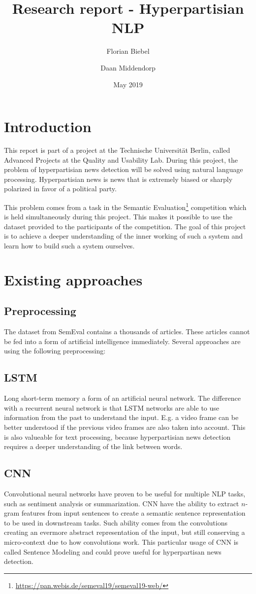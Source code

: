 \documentclass{article}
\title{Research report - Hyperpartisian NLP}
\author{Florian Biebel \and Daan Middendorp}
\date{May 2019}
\begin{document}
\maketitle

\section{Introduction}
This report is part of a project at the Technische Universität Berlin, called Advanced Projects at the Quality and Usability Lab. During this project, the problem of hyperpartisian news detection will be solved using natural language processing. Hyperpartisian news is news that is extremely biased or sharply polarized in favor of a political party.

This problem comes from a task in the Semantic Evaluation\footnote{\url{https://pan.webis.de/semeval19/semeval19-web/}} competition which is held simultaneously during this project. This makes it possible to use the dataset provided to the participants of the competition. The goal of this project is to achieve a deeper understanding of the inner working of such a system and learn how to build such a system ourselves.

\section{Existing approaches}
\subsection{Preprocessing}
The dataset from SemEval contains a thousands of articles. These articles cannot be fed into a form of artificial intelligence immediately. Several approaches are using the following preprocessing:


\subsection{LSTM}
Long short-term memory a form of an artificial neural network. The difference with a recurrent neural network is that LSTM networks are able to use information from the past to understand the input. E.g. a video frame can be better understood if the previous video frames are also taken into account. This is also valueable for text processing, because hyperpartisian news detection requires a deeper understanding of the link between words.
\subsection{CNN}
Convolutional  neural networks have proven to be useful for multiple NLP tasks, such as sentiment analysis or summarization.
CNN have the ability to extract $n$-gram features from input sentences to create a semantic sentence representation to be used in downstream tasks.
Such ability comes from the convolutions creating an evermore abstract representation of the input, but still conserving a micro-context due to how convolutions work.
This particular usage of CNN is called Sentence Modeling and could prove useful for hyperpartisan news detection.
\end{document}
